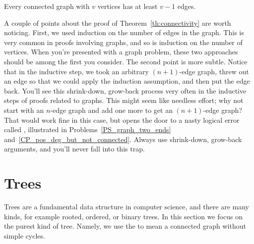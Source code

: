 \begin{corollary}
\label{cor:n-1}
Every connected graph with $v$ vertices has at least $v - 1$ edges.
\end{corollary}

A couple of points about the proof of Theorem~\ref{th:connectivity} are
worth noticing.  First, we used induction on the number of
edges in the graph.  This is very common in proofs involving graphs, and
so is induction on the number of vertices.  When you're presented with a
graph problem, these two approaches should be among the first you
consider.  The second point is more subtle.  Notice that in the inductive
step, we took an arbitrary $(n+1)$-edge graph, threw out an edge so that
we could apply the induction assumption, and then put the edge back.
You'll see this shrink-down, grow-back process very often in the inductive
steps of proofs related to graphs.  This might seem like needless effort;
why not start with an $n$-edge graph and add one more to get an
$(n+1)$-edge graph?  That would work fine in this case, but opens the door
to a nasty logical error called , illustrated in
Problems~\ref{PS_graph_two_ends} and~\ref{CP_pos_deg_but_not_connected}.
Always use shrink-down, grow-back arguments, and you'll never fall into
this trap.


\begin{problems}
\classproblems
{}
\homeworkproblems
{}


\homeworkproblems
{}
\end{problems}


\section{Trees}\label{trees-sec}
Trees are a fundamental data structure in computer science, and there are
many kinds, for example rooted, ordered, or binary trees.  In this section
we focus on the purest kind of tree.  Namely, we use the  to
mean a connected graph without simple cycles.

